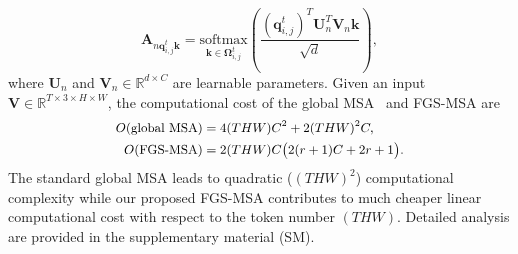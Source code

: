 \documentclass{article}
\begin{document}
	\begin{equation}
	\mathbf{A}_{n\boldsymbol{q}_{i,j}^t\boldsymbol{k}} = \underset{\boldsymbol{k}\in\mathbf{\Omega}_{i,j}^t}{\text{softmax}} (\frac{(\boldsymbol{q}_{i,j}^t)^T\mathbf{U}_n^T\mathbf{V}_n\boldsymbol{k}}{\sqrt{d}}),
	\label{eq:ScaledDotProductAttn}
	\end{equation}
	where $\mathbf{U}_n$ and $\mathbf{V}_n \in \mathbb{R}^{d\times C}$ are learnable parameters. Given an input $\mathbf{V} \in \mathbb{R}^{T\times 3 \times H \times W}$, the computational cost of the global MSA~\cite{global_msa} and FGS-MSA are
	\vspace{-1mm}
	\begin{equation}
	\small
\begin{aligned}
	O{(\text{global MSA})}&=4(THW)C^2 + 2(THW)^2C,\\
O{(\text{FGS-MSA})}&= 2(THW)C\big(2(r+1)C+2r+1\big).\\
	\label{eq:complexity}
\end{aligned}
	\vspace{-6mm}
	\end{equation}
The standard global MSA leads to quadratic ($(THW)^2$) computational complexity while our proposed FGS-MSA contributes to much cheaper linear computational cost with respect to the token number $(THW)$. Detailed analysis are provided in the supplementary material (SM).
	
\end{document}
